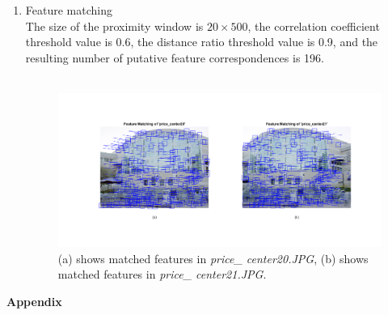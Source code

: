 \documentclass{assignment}
\begin{document}
\begin{problemlist}
\begin{enumerate}
\item Feature matching\\
The size of the proximity window is $20\times500$, the correlation coefficient threshold value is 0.6, the distance ratio threshold value is 0.9, and the resulting
number of putative feature correspondences is 196.\\
\\
\begin{figure}[H]
  \includegraphics[width=6in]{FeatureMatch}
\caption{(a) shows matched features in \emph{price\_ center20.JPG}, (b) shows matched features in \emph{price\_ center21.JPG}.}
\label{fig:images}
\end{figure} 

\end{enumerate}
\end{problemlist}

\begin{flushleft}
\large{\textbf{Appendix}}
\end{flushleft}
\end{document}
